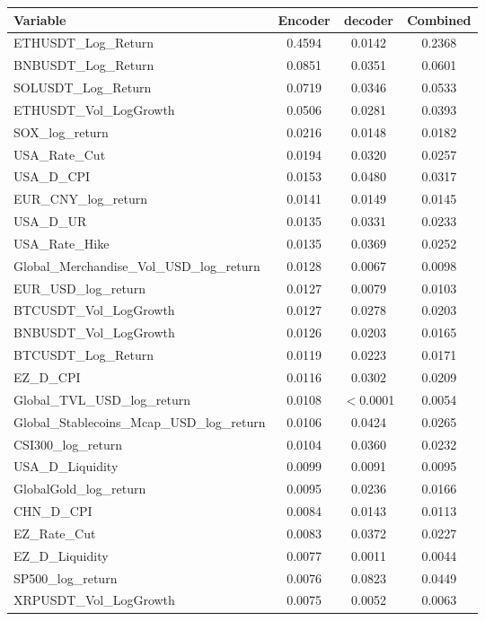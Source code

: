 \begin{tabular}{lccc}
  \toprule
  \textbf{Variable} & \textbf{Encoder} & \textbf{decoder} & \textbf{Combined} \\ 
  \midrule
  ETHUSDT\_Log\_Return & 0.4594 & 0.0142 & 0.2368 \\ 
  BNBUSDT\_Log\_Return & 0.0851 & 0.0351 & 0.0601 \\ 
  SOLUSDT\_Log\_Return & 0.0719 & 0.0346 & 0.0533 \\ 
  ETHUSDT\_Vol\_LogGrowth & 0.0506 & 0.0281 & 0.0393 \\ 
  SOX\_log\_return & 0.0216 & 0.0148 & 0.0182 \\ 
  USA\_Rate\_Cut & 0.0194 & 0.0320 & 0.0257 \\ 
  USA\_D\_CPI & 0.0153 & 0.0480 & 0.0317 \\ 
  EUR\_CNY\_log\_return & 0.0141 & 0.0149 & 0.0145 \\ 
  USA\_D\_UR & 0.0135 & 0.0331 & 0.0233 \\ 
  USA\_Rate\_Hike & 0.0135 & 0.0369 & 0.0252 \\ 
  Global\_Merchandise\_Vol\_USD\_log\_return & 0.0128 & 0.0067 & 0.0098 \\ 
  EUR\_USD\_log\_return & 0.0127 & 0.0079 & 0.0103 \\ 
  BTCUSDT\_Vol\_LogGrowth & 0.0127 & 0.0278 & 0.0203 \\ 
  BNBUSDT\_Vol\_LogGrowth & 0.0126 & 0.0203 & 0.0165 \\ 
  BTCUSDT\_Log\_Return & 0.0119 & 0.0223 & 0.0171 \\ 
  EZ\_D\_CPI & 0.0116 & 0.0302 & 0.0209 \\ 
  Global\_TVL\_USD\_log\_return & 0.0108 & $<$0.0001 & 0.0054 \\ 
  Global\_Stablecoins\_Mcap\_USD\_log\_return & 0.0106 & 0.0424 & 0.0265 \\ 
  CSI300\_log\_return & 0.0104 & 0.0360 & 0.0232 \\ 
  USA\_D\_Liquidity & 0.0099 & 0.0091 & 0.0095 \\ 
  GlobalGold\_log\_return & 0.0095 & 0.0236 & 0.0166 \\ 
  CHN\_D\_CPI & 0.0084 & 0.0143 & 0.0113 \\ 
  EZ\_Rate\_Cut & 0.0083 & 0.0372 & 0.0227 \\ 
  EZ\_D\_Liquidity & 0.0077 & 0.0011 & 0.0044 \\ 
  SP500\_log\_return & 0.0076 & 0.0823 & 0.0449 \\ 
  XRPUSDT\_Vol\_LogGrowth & 0.0075 & 0.0052 & 0.0063 \\ 

\end{tabular}

